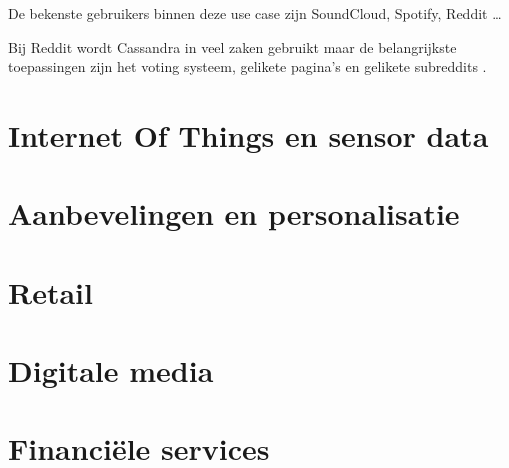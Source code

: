 De bekenste gebruikers binnen deze use case zijn SoundCloud, Spotify, Reddit \dots

Bij Reddit wordt Cassandra in veel zaken gebruikt maar de belangrijkste toepassingen zijn  het voting systeem, gelikete pagina's en gelikete subreddits \citep{Harvey2013Reddit}.

\section{Internet Of Things en sensor data}


\section{Aanbevelingen en personalisatie}

\section{Retail}

\section{Digitale media}

\section{Financiële services}
